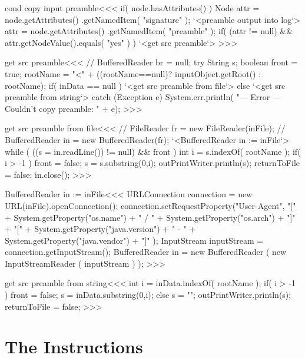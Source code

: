 \documentclass{article}
\begin{document}
{\<cond copy input preamble\><<<
if( node.hasAttributes() ){
   Node attr = node.getAttributes()
                   .getNamedItem( "signature" );
   `<preamble output into log`>
   attr = node.getAttributes()
                   .getNamedItem( "preamble" );
   if( (attr != null) 
       && attr.getNodeValue().equals( "yes" ) ){
      `<get src preamble`>
} } 
>>>


\<get src preamble\><<<
// BufferedReader br = null;
try {
   String s;
   boolean front = true;   
   rootName = "<" + ((rootName==null)? inputObject.getRoot() : rootName);
   if( inData == null ){
      `<get src preamble from file`>
   } else {
      `<get src preamble from string`>
   }
} catch (Exception e) {
   System.err.println(
        "--- Error --- Couldn't copy preamble: " + e);
}
>>>




\<get src preamble from file\><<<
// FileReader fr = new FileReader(inFile);
// BufferedReader in = new BufferedReader(fr);
`<BufferedReader in := inFile`>
while (  ((s = in.readLine()) != null) && front ) {
   int i = s.indexOf( rootName );
   if( i > -1 ){
      front = false;
      s = s.substring(0,i);
   }
   outPrintWriter.println(s);
   returnToFile = false;
}
in.close();
>>>

\<BufferedReader in := inFile\><<<
URLConnection connection = 
             new URL(inFile).openConnection();
connection.setRequestProperty("User-Agent",
                "["
              + System.getProperty("os.name")
              + " / "
              + System.getProperty("os.arch")
              + "]"
              + "["
              + System.getProperty("java.version")
              + " - "
              + System.getProperty("java.vendor")
              + "]"
);
InputStream inputStream = connection.getInputStream();
BufferedReader in = new BufferedReader (
                        new InputStreamReader ( inputStream ) );
>>>






\<get src preamble from string\><<<
int i = inData.indexOf( rootName );
if( i > -1 ){
   front = false;
   s = inData.substring(0,i);
} else { s = ""; }
outPrintWriter.println(s);
returnToFile = false;
>>>




\section{The Instructions}



}
\end{document}
